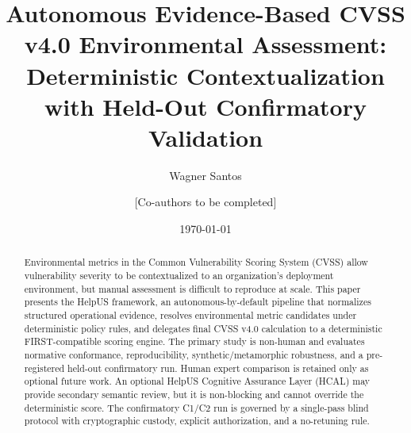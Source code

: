 \documentclass[11pt,a4paper]{article}
\title{Autonomous Evidence-Based CVSS v4.0 Environmental Assessment:\\
Deterministic Contextualization with Held-Out Confirmatory Validation}
\author{
Wagner Santos \and
[Co-authors to be completed]
}
\date{\today}
\begin{document}
\maketitle

\begin{abstract}
Environmental metrics in the Common Vulnerability Scoring System (CVSS) allow
vulnerability severity to be contextualized to an organization's deployment
environment, but manual assessment is difficult to reproduce at scale. This
paper presents the HelpUS framework, an autonomous-by-default pipeline that
normalizes structured operational evidence, resolves environmental metric
candidates under deterministic policy rules, and delegates final CVSS v4.0
calculation to a deterministic FIRST-compatible scoring engine. The primary
study is non-human and evaluates normative conformance, reproducibility,
synthetic/metamorphic robustness, and a pre-registered held-out confirmatory
run. Human expert comparison is retained only as optional future work. An
optional HelpUS Cognitive Assurance Layer (HCAL) may provide secondary
semantic review, but it is non-blocking and cannot override the deterministic
score. The confirmatory C1/C2 run is governed by a single-pass blind protocol
with cryptographic custody, explicit authorization, and a no-retuning rule.
\end{abstract}















\appendix

\end{document}
